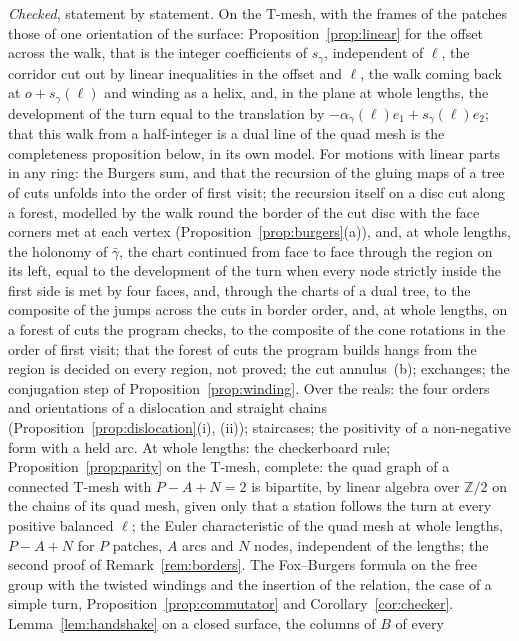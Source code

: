 \documentclass[11pt,a4paper]{article}
\newcommand{\Z}{\mathbb{Z}}
\newcommand{\shift}{s}
\begin{document}
\ifdefined\plain
\emph{Checked}, statement by statement. On the T-mesh, with the frames of
the patches those of one orientation of the surface:
Proposition~\ref{prop:linear} for the offset across the walk, that is the
integer coefficients of $\shift_\gamma$, independent of $\ell$, the corridor
cut out by linear inequalities in the offset and $\ell$, the walk coming
back at $o + \shift_\gamma(\ell)$ and winding as a helix, and, in the plane
at whole lengths, the development of the turn equal to the translation by
$-\alpha_\gamma(\ell) e_1 + \shift_\gamma(\ell) e_2$; that this walk from
a half-integer is a dual line of the quad mesh is the completeness proposition
below, in its own model. For motions with linear parts in any
ring: the Burgers sum, and that the recursion of the gluing maps of a tree of
cuts unfolds into the order of first visit; the recursion itself on a disc cut
along a forest, modelled by the walk round the border of the cut disc with the
face corners met at each vertex (Proposition~\ref{prop:burgers}(a)), and,
at whole lengths, the holonomy of $\bar\gamma$, the chart continued from face
to face through the region on its left, equal to the development of the turn
when every node strictly inside the first side is met by four faces, and,
through the charts of a dual tree, to the composite of the jumps across the
cuts in border order, and, at whole lengths, on a forest of cuts the program
checks, to the composite of the cone rotations in the order of first visit;
that the forest of cuts the program builds hangs from the region is decided
on every region, not proved; the cut annulus~(b); exchanges; the
conjugation step of Proposition~\ref{prop:winding}. Over the reals: the four
orders and orientations of a dislocation and straight chains
(Proposition~\ref{prop:dislocation}(i), (ii)); staircases; the positivity of
a non-negative form with a held arc. At whole lengths: the checkerboard rule;
Proposition~\ref{prop:parity} on the T-mesh, complete: the quad graph of a
connected T-mesh with $P - A + N = 2$ is bipartite, by linear algebra over
$\Z/2$ on the chains of its quad mesh, given only that a station follows the
turn at every positive balanced $\ell$; the Euler characteristic of the quad
mesh at whole lengths, $P - A + N$ for $P$ patches, $A$ arcs and $N$ nodes,
independent of the lengths; the second proof of Remark~\ref{rem:borders}. The
Fox--Burgers formula on the free group with the twisted windings and the
insertion of the relation, the case of a simple turn,
Proposition~\ref{prop:commutator} and Corollary~\ref{cor:checker}.
Lemma~\ref{lem:handshake} on a closed surface, the columns of $B$ of every
\end{document}
